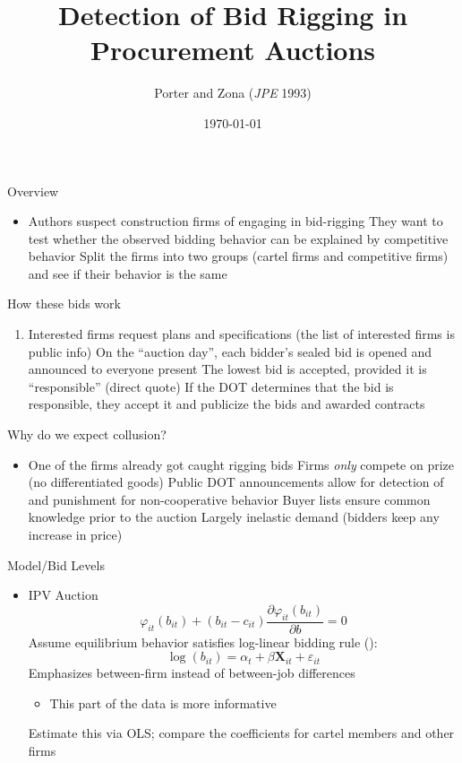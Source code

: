 \documentclass[dvipsnames]{beamer}
\title{Detection of Bid Rigging in Procurement Auctions}
\author{Porter and Zona (\emph{JPE} 1993)}
\date{\today}
\begin{document}
\maketitle
\begin{frame}{Overview}
  \begin{itemize}
  \item Authors suspect construction firms of engaging in bid-rigging
    \vitem They want to test whether the observed bidding behavior can be explained by competitive behavior
    \vitem Split the firms into two groups (cartel firms and competitive firms) and see if their behavior is the same
  \end{itemize}
\end{frame}
%
\begin{frame}{How these bids work}
  \begin{enumerate}
  \item Interested firms request plans and specifications (the list of interested firms is public info)
    \vitem On the ``auction day'', each bidder's sealed bid is opened and announced to everyone present
    \vitem The lowest bid is accepted, provided it is ``responsible'' (direct quote)
    \vitem If the DOT determines that the bid is responsible, they accept it and publicize the bids and awarded contracts
  \end{enumerate}
\end{frame}
%
\begin{frame}{Why do we expect collusion?}
  \begin{itemize}
  \item One of the firms already got caught rigging bids
    \vitem Firms \emph{only} compete on prize (no differentiated goods)
    \vitem Public DOT announcements allow for detection of and punishment for non-cooperative behavior
    \vitem Buyer lists ensure common knowledge prior to the auction
    \vitem Largely inelastic demand (bidders keep any increase in price)
  \end{itemize}
\end{frame}
%
\begin{frame}{Model/Bid Levels}
  \begin{itemize}
  \item IPV Auction
    \begin{equation}
\varphi_{it} (b_{it}) + (b_{it} - c_{it})\frac{\partial \varphi_{it}(b_{it})}{\partial b} = 0\tag{FOC}
    \end{equation}
    \vitem Assume equilibrium behavior satisfies log-linear bidding rule ():
    \[
\log (b_{it}) = \alpha_t + \beta \mathbf{X}_{it} + \varepsilon_{it}
    \]
    \vitem Emphasizes between-firm instead of between-job differences
    \begin{itemize}
    \item This part of the data is more informative
    \end{itemize}
    \vitem Estimate this via OLS; compare the coefficients for cartel members and other firms
  \end{itemize}
\end{frame}
\end{document}
